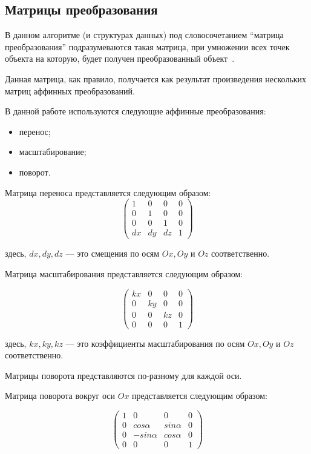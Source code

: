 \subsection{Матрицы преобразования}

В данном алгоритме (и структурах данных) под словосочетанием ``матрица преобразования'' подразумеваются такая матрица, при умножении всех точек объекта на которую, будет получен преобразованный объект~\cite{CGPaP}.

Данная матрица, как правило, получается как результат произведения нескольких матриц аффинных преобразований.

В данной работе используются следующие аффинные преобразования:

\begin{itemize}
    \item перенос;
    \item масштабирование;
    \item поворот.
\end{itemize}

Матрица переноса представляется следующим образом:
$$
\begin{pmatrix}
    1 & 0 & 0 & 0 \\
    0 & 1 & 0 & 0 \\
    0 & 0 & 1 & 0 \\
    dx & dy & dz & 1
\end{pmatrix}
$$

здесь, $dx, dy, dz$ --- это смещения по осям $Ox, Oy$ и $Oz$ соответственно.

Матрица масштабирования представляется следующим образом:

$$
\begin{pmatrix}
    kx & 0 & 0 & 0 \\
    0 & ky & 0 & 0 \\
    0 & 0 & kz & 0 \\
    0 & 0 & 0 & 1
\end{pmatrix}
$$

здесь, $kx, ky, kz$ --- это коэффициенты масштабирования по осям $Ox, Oy$ и $Oz$ соответственно.

Матрицы поворота представляются по-разному для каждой оси.

Матрица поворота вокруг оси $Ox$ представляется следующим образом:

$$
\begin{pmatrix}
    1 & 0 & 0 & 0 \\
    0 & cos \alpha & sin \alpha & 0 \\
    0 & -sin \alpha & cos \alpha & 0 \\
    0 & 0 & 0 & 1
\end{pmatrix}
$$

